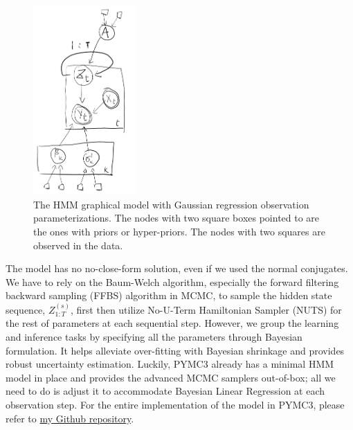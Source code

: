 \documentclass[11pt, letterpaper, journal]{IEEEtran}
\begin{document}
\begin{figure}[h]
\centering
\includegraphics[width=0.35\textwidth]{4.a.png}
\caption{The HMM graphical model with Gaussian regression observation parameterizations. The nodes with two square boxes pointed to are the ones with priors or hyper-priors. The nodes with two squares are observed in the data.}
\label{fig:HMM_graph}
\end{figure}

The model has no no-close-form solution, even if we used the normal conjugates. We have to rely on the Baum-Welch algorithm, especially the forward filtering backward sampling (FFBS) algorithm in MCMC, to sample the hidden state sequence, $Z^{(s)}_{1:T}$, first then utilize No-U-Term Hamiltonian Sampler (NUTS) for the rest of parameters at each sequential step. However, we group the learning and inference tasks by specifying all the parameters through Bayesian formulation. It helps alleviate over-fitting with Bayesian shrinkage and provides robust uncertainty estimation. Luckily, PYMC3 \cite{Salvatier} already has a minimal HMM model in place and provides the advanced MCMC samplers out-of-box; all we need to do is adjust it to accommodate Bayesian Linear Regression at each observation step. For the entire implementation of the model in PYMC3, please refer to \href{https://github.com/WHITSNAK/sta571/tree/main/project}{my Github repository}.
\end{document}
